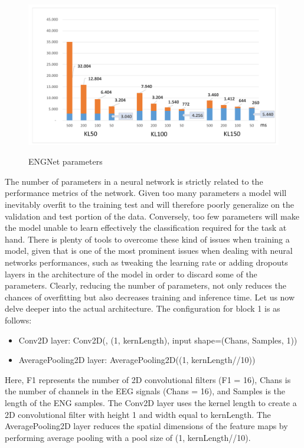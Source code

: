 \documentclass{Configuration_Files/PoliMi3i_thesis}
\begin{document}
\begin{figure}[H]
	\includegraphics[scale=0.3]{engNet_params.png}
	\centering
    \label{engNet_params_1}
    \caption{ENGNet parameters \cite{tesiDavide}}
\end{figure}

The number of parameters in a neural network is strictly related to the performance metrics of the network.
Given too many parameters a model will inevitably overfit to the training test and will therefore poorly generalize on the validation and test portion of the data. Conversely, too few parameters will make the model unable to learn effectively the classification required for the task at hand.
There is plenty of tools to overcome these kind of issues when training a model, given that is one of the most prominent issues when dealing with neural networks performances, such as tweaking the learning rate or adding dropouts layers in the architecture of the model in order to discard some of the parameters.
Clearly, reducing the number of parameters, not only reduces the chances of overfitting but also decreases training and inference time.
Let us now delve deeper into the actual architecture.
The configuration for block 1 is as follows:
\begin{itemize}
\item Conv2D layer: Conv2D(, (1, kernLength), input shape=(Chans, Samples, 1))
\item AveragePooling2D layer: AveragePooling2D((1, kernLength//10))
\end{itemize}

Here, F1 represents the number of 2D convolutional filters (F1 = 16), Chans is the number of channels in the EEG signals (Chans = 16), and Samples is the length of the ENG samples. The Conv2D layer uses the kernel length to create a 2D convolutional filter with height 1 and width equal to kernLength. The AveragePooling2D layer reduces the spatial dimensions of the feature maps by performing average pooling with a pool size of (1, kernLength//10). \cite{tesiDavide}
\end{document}
